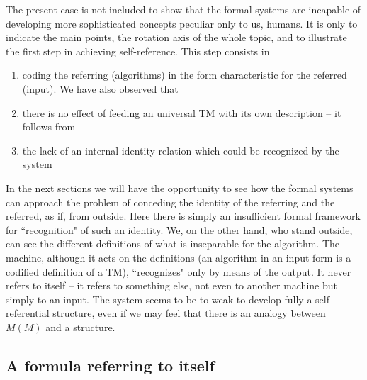 The present case is not included to show that the formal systems are incapable of developing
more sophisticated concepts peculiar only to us, humans. It is only to indicate the main 
points, the rotation axis of 
the whole topic, and to illustrate the first step in achieving self-reference. This step consists in
\begin{enumerate}
\item \label{tm:i}coding the referring (algorithms) in the form characteristic for the referred 
(input). We have also observed that
\item \label{tm:ii}there is no effect of feeding an universal TM with its own description -- it follows from
\item \label{tm:iii}the lack of an internal identity relation which could be recognized by the system 
\end{enumerate}
In the next sections we will have the opportunity to see how the formal systems can approach the problem of 
conceding the identity of the referring and the referred, as if, from outside. Here there is simply an insufficient 
formal framework for ``recognition" of such an identity. We, on the other hand, who stand outside, can see the 
different definitions of what is inseparable for the algorithm. The machine, although it acts on the definitions (an 
algorithm in an input form is a codified definition of a TM), ``recognizes" only by means of the output. It never 
refers to itself -- it refers to something else, not even to another machine but simply to an input. The system seems 
to be to weak to develop fully a self-referential structure, even if we may feel that there
is an analogy between $M(M)$ and a structure.

\subsection{A formula referring to itself}\label{su:godel}

